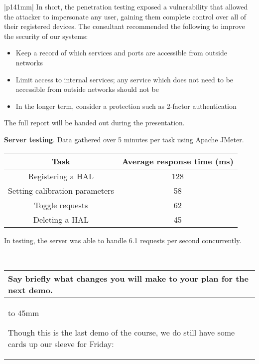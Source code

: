 \documentclass[a4paper]{article}
\newcommand{\colWidth}{141mm}
\begin{document}
\begin{center}
\begin{tabular}{|p{\colWidth}|}
	In short, the penetration testing exposed a vulnerability that allowed the attacker to impersonate
	any user, gaining them complete control over all of their registered devices. The consultant recommended
	the following to improve the security of our systems:

	\begin{itemize}
		\item Keep a record of which services and ports are accessible from outside networks
		\item Limit access to internal services; any service which does not need to be accessible from outside networks should not be
		\item In the longer term, consider a protection such as 2-factor authentication
	\end{itemize}

	The full report will be handed out during the presentation.

	\vspace{3mm}

	\textbf{Server testing}. Data gathered over 5 minutes per task using Apache JMeter.

	\vspace{3mm}

	\begin{tabular}{| c | c |} \hline
		\textbf{Task} & \textbf{Average response time (ms)} \\ \hline
		Registering a HAL & 128 \\
		Setting calibration parameters & 58 \\
		Toggle requests & 62 \\
		Deleting a HAL & 45 \\ \hline
	\end{tabular}

	In testing, the server was able to handle 6.1 requests per second concurrently.

  \\
  \hline
\end{tabular}
\vskip 5mm


\begin{tabular}{|p{\colWidth}|}
	\hline
	\cellcolor{blue!25}\large
	\textbf{Say briefly what changes you will make to your plan for the next demo.}
	\\ \hline
	\vtop to 45mm{
		Though this is the last demo of the course, we do still have some cards up our sleeve for Friday:

}
\end{tabular}
\end{center}
\end{document}

